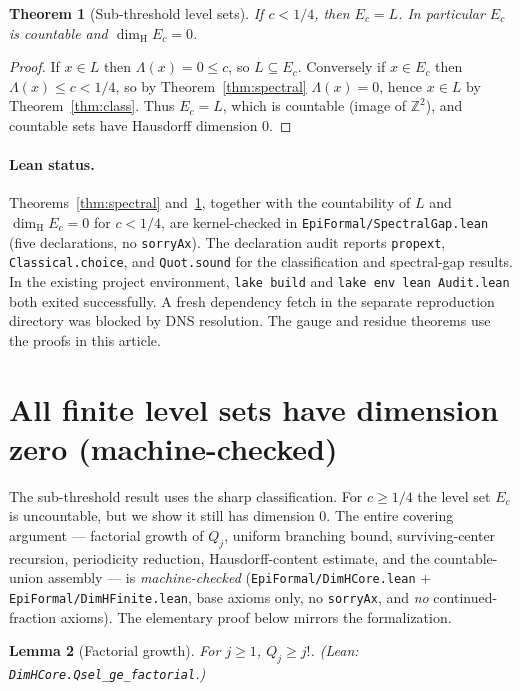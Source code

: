 \documentclass[11pt]{article}
\newtheorem{theorem}{Theorem}
\newtheorem{lemma}[theorem]{Lemma}
\theoremstyle{definition}
\theoremstyle{remark}
\newcommand{\Z}{\mathbb{Z}}
\newcommand{\dimH}{\dim_{\mathrm{H}}}
\newcommand{\Lam}{\Lambda}
\begin{document}
\begin{theorem}[Sub-threshold level sets]\label{thm:sub}
If $c<1/4$, then $E_c=L$. In particular $E_c$ is countable and
$\dimH E_c=0$.
\end{theorem}

\begin{proof}
If $x\in L$ then $\Lam(x)=0\le c$, so $L\subseteq E_c$. Conversely if
$x\in E_c$ then $\Lam(x)\le c<1/4$, so by Theorem~\ref{thm:spectral}
$\Lam(x)=0$, hence $x\in L$ by Theorem~\ref{thm:class}. Thus $E_c=L$, which is
countable (image of $\Z^2$), and countable sets have Hausdorff dimension $0$.
\end{proof}

\paragraph{Lean status.} Theorems~\ref{thm:spectral} and~\ref{thm:sub}, together
with the countability of $L$ and $\dimH E_c=0$ for $c<1/4$, are kernel-checked in
\texttt{EpiFormal/SpectralGap.lean} (five declarations, no \texttt{sorryAx}).
The declaration audit reports \texttt{propext}, \texttt{Classical.choice}, and
\texttt{Quot.sound} for the classification and spectral-gap results.
In the existing project environment, \texttt{lake build} and
\texttt{lake env lean Audit.lean} both exited successfully. A fresh
dependency fetch in the separate reproduction directory was blocked by
DNS resolution. The gauge and residue theorems use the proofs in this article.

\section{All finite level sets have dimension zero (machine-checked)}

The sub-threshold result uses the sharp classification. For $c\ge1/4$ the level
set $E_c$ is uncountable, but we show it still has dimension $0$. The entire
covering argument --- factorial growth of $Q_j$, uniform branching bound,
surviving-center recursion, periodicity reduction, Hausdorff-content estimate,
and the countable-union assembly --- is \emph{machine-checked}
(\texttt{EpiFormal/DimHCore.lean} + \texttt{EpiFormal/DimHFinite.lean}, base
axioms only, no \texttt{sorryAx}, and \emph{no} continued-fraction axioms).
The elementary proof below mirrors the formalization.

\begin{lemma}[Factorial growth]\label{lem:factorial}
For $j\ge1$, $Q_j\ge j!$. (Lean: \texttt{DimHCore.\allowbreak Qsel\_ge\_factorial}.)
\end{lemma}
\end{document}
